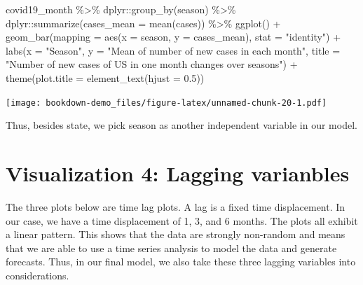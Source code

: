 \documentclass[
]{book}
\newenvironment{Shaded}{\begin{snugshade}}{\end{snugshade}}
\newcommand{\AttributeTok}[1]{\textcolor[rgb]{0.77,0.63,0.00}{#1}}
\newcommand{\FloatTok}[1]{\textcolor[rgb]{0.00,0.00,0.81}{#1}}
\newcommand{\FunctionTok}[1]{\textcolor[rgb]{0.00,0.00,0.00}{#1}}
\newcommand{\NormalTok}[1]{#1}
\newcommand{\SpecialCharTok}[1]{\textcolor[rgb]{0.00,0.00,0.00}{#1}}
\newcommand{\StringTok}[1]{\textcolor[rgb]{0.31,0.60,0.02}{#1}}
\begin{document}
\begin{Shaded}
\begin{Highlighting}[]
\NormalTok{covid19\_month }\SpecialCharTok{\%\textgreater{}\%}
\NormalTok{  dplyr}\SpecialCharTok{::}\FunctionTok{group\_by}\NormalTok{(season) }\SpecialCharTok{\%\textgreater{}\%}
\NormalTok{  dplyr}\SpecialCharTok{::}\FunctionTok{summarize}\NormalTok{(}\AttributeTok{cases\_mean =} \FunctionTok{mean}\NormalTok{(cases)) }\SpecialCharTok{\%\textgreater{}\%}
  \FunctionTok{ggplot}\NormalTok{() }\SpecialCharTok{+}
  \FunctionTok{geom\_bar}\NormalTok{(}\AttributeTok{mapping =} \FunctionTok{aes}\NormalTok{(}\AttributeTok{x =}\NormalTok{ season, }\AttributeTok{y =}\NormalTok{ cases\_mean), }\AttributeTok{stat =} \StringTok{"identity"}\NormalTok{) }\SpecialCharTok{+}
  \FunctionTok{labs}\NormalTok{(}\AttributeTok{x =} \StringTok{"Season"}\NormalTok{, }\AttributeTok{y =} \StringTok{"Mean of number of new cases in each month"}\NormalTok{, }\AttributeTok{title =} \StringTok{"Number of new cases of US in one month changes over seasons"}\NormalTok{) }\SpecialCharTok{+}
  \FunctionTok{theme}\NormalTok{(}\AttributeTok{plot.title =} \FunctionTok{element\_text}\NormalTok{(}\AttributeTok{hjust =} \FloatTok{0.5}\NormalTok{))}
\end{Highlighting}
\end{Shaded}

\texttt{[image: bookdown-demo\_files/figure-latex/unnamed-chunk-20-1.pdf]}

Thus, besides state, we pick season as another independent variable in our model.

\hypertarget{visualization-4-lagging-varianbles}{%
\section{Visualization 4: Lagging varianbles}\label{visualization-4-lagging-varianbles}}

The three plots below are time lag plots. A lag is a fixed time displacement. In our case, we have a time displacement of 1, 3, and 6 months. The plots all exhibit a linear pattern. This shows that the data are strongly non-random and means that we are able to use a time series analysis to model the data and generate forecasts. Thus, in our final model, we also take these three lagging variables into considerations.
\end{document}
